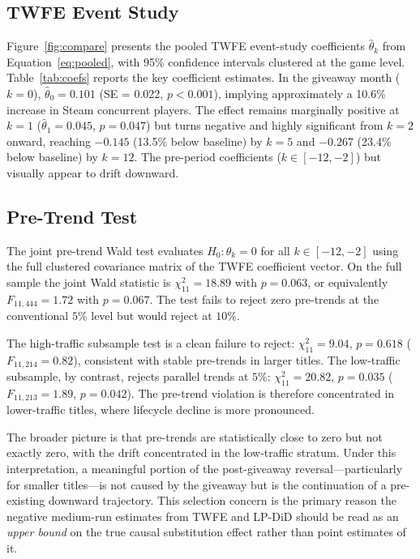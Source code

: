 \documentclass[11pt]{article}
\begin{document}
\subsection{TWFE Event Study}
\label{ssec:twfe}

Figure~\ref{fig:compare} presents the pooled TWFE event-study
coefficients $\hat{\theta}_k$ from Equation~\eqref{eq:pooled}, with 95\%
confidence intervals clustered at the game level. Table~\ref{tab:coefs} reports the key coefficient
estimates. In the giveaway month ($k = 0$), $\hat{\theta}_0 = 0.101$
(SE = 0.022, $p < 0.001$), implying approximately a 10.6\% increase in Steam
concurrent players. The effect remains marginally positive at $k = 1$
($\hat{\theta}_1 = 0.045$, $p = 0.047$) but turns negative and highly significant
from $k = 2$ onward, reaching $-0.145$ (13.5\% below baseline) by $k = 5$ and
$-0.267$ (23.4\% below baseline) by $k = 12$. The pre-period coefficients
($k \in [-12, -2]$) but visually appear to drift downward.

\subsection{Pre-Trend Test}
\label{ssec:pretrend}

The joint pre-trend Wald test evaluates $H_0: \theta_k = 0$ for all
$k \in [-12, -2]$ using the full clustered covariance matrix of the TWFE
coefficient vector.
On the full sample the joint Wald statistic is $\chi^2_{11} = 18.89$ with
$p = 0.063$, or equivalently $F_{11, 444} = 1.72$ with $p = 0.067$. The test fails to reject zero pre-trends at the conventional
$5\%$ level but would reject at $10\%$.

The high-traffic subsample test is a clean failure to reject:
$\chi^2_{11} = 9.04$, $p = 0.618$ ($F_{11, 214} = 0.82$), consistent with
stable pre-trends in larger titles. The low-traffic subsample, by contrast,
rejects parallel trends at $5\%$: $\chi^2_{11} = 20.82$, $p = 0.035$
($F_{11, 213} = 1.89$, $p = 0.042$). The pre-trend violation is therefore
concentrated in lower-traffic titles, where lifecycle decline is more pronounced.

The broader picture is that pre-trends are statistically close to zero but not exactly zero,
with the drift concentrated in the low-traffic stratum. 
Under this interpretation, a meaningful portion of the
post-giveaway reversal---particularly for smaller titles---is not caused by the
giveaway but is the continuation of a pre-existing downward trajectory. This
selection concern is the primary reason the negative medium-run estimates from
TWFE and LP-DiD should be read as an \emph{upper bound} on the true causal
substitution effect rather than point estimates of it.
\end{document}
